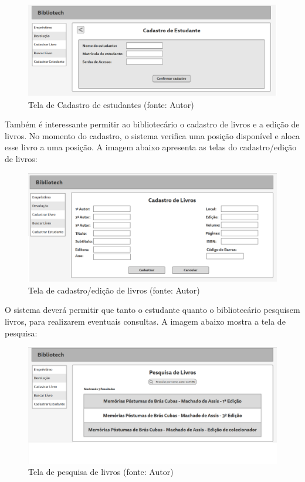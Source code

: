 \begin{figure}[!h]
\centering
\includegraphics[scale=0.40, angle = 360]{figuras/prototipo3}
\caption[]{Tela de Cadastro de estudantes (fonte: Autor)}
\label{Tela de Cadastro de estudantes}
\end{figure}
\FloatBarrier

Também é interessante permitir ao bibliotecário o cadastro de livros e a edição de livros. No momento do cadastro, o sistema verifica uma posição disponível e aloca esse livro a uma posição. A imagem abaixo apresenta as telas do cadastro/edição de livros:

\begin{figure}[!h]
\centering
\includegraphics[scale=0.40, angle = 360]{figuras/prototipo4}
\caption[]{Tela de cadastro/edição de livros (fonte: Autor)}
\label{Tela de cadastro/edição de livros}
\end{figure}
\FloatBarrier

O sistema deverá permitir que tanto o estudante quanto o bibliotecário pesquisem livros, para realizarem eventuais consultas. A imagem abaixo mostra a tela de pesquisa:

\begin{figure}[!h]
\centering
\includegraphics[scale=0.40, angle = 360]{figuras/prototipo5}
\caption[]{Tela de pesquisa de livros (fonte: Autor)}
\label{Tela de pesquisa de livros}
\end{figure}
\FloatBarrier

